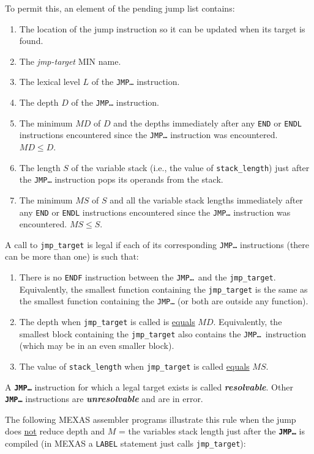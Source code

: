\documentclass[12pt]{article}
\newcommand{\TT}[1]{{\tt \bfseries #1}}
\newcommand{\key}[1]{{\bf \em #1}\index{#1}}
\begin{document}
To permit this, an element of the pending jump list contains:
\begin{enumerate}
\item The location of the jump instruction so it can be updated
when its target is found.
\item The {\em jmp-target} MIN name.
\item The lexical level $L$ of the {\tt JMP\ldots} instruction.
\item The depth $D$ of the {\tt JMP\ldots} instruction.
\item The minimum $MD$ of $D$ and
      the depths immediately after any {\tt END} or {\tt ENDL} instructions
      encountered since the {\tt JMP\ldots} instruction was encountered.
      $MD\le D$.
\item The length $S$ of the variable stack (i.e., the value of
      {\tt stack\_length}) just after the {\tt JMP\ldots}
      instruction pops its operands from the stack.
\item The minimum $MS$ of $S$ and all the variable stack lengths immediately
      after any {\tt END} or {\tt ENDL} instructions encountered
      since the {\tt JMP\ldots} instruction was encountered.
      $MS\le S$.
\end{enumerate}

A call to {\tt jmp\_target} is legal if each of its
corresponding {\tt JMP\ldots} instructions (there can be more than one)
is such that:
\begin{enumerate}
\item
There is no {\tt ENDF} instruction between the
{\tt JMP\ldots}~and the {\tt jmp\_target}.
Equivalently, the smallest function containing the {\tt jmp\_target}
is the same as the smallest function containing the {\tt JMP\ldots}
(or both are outside any function).
\item The depth when {\tt jmp\_target} is called is \underline{equals} $MD$.
Equivalently, the smallest block containing the {\tt jmp\_target}
also contains the {\tt JMP\ldots}~instruction (which may be in an even
smaller block).
\item The value of {\tt stack\_length} when {\tt jmp\_target}
is called \underline{equals} $MS$.
\end{enumerate}

A \TT{JMP\ldots} instruction for which a legal target exists
is called \key{resolvable}.  Other \TT{JMP\ldots} instructions
are \key{unresolvable} and are in error.

The following MEXAS assembler programs illustrate this
rule when the jump does \underline{not}
reduce depth and $M$ = the variables stack length just after the
\TT{JMP\ldots} is compiled (in MEXAS a {\tt LABEL} statement
just calls {\tt jmp\_target}):
\end{document}
